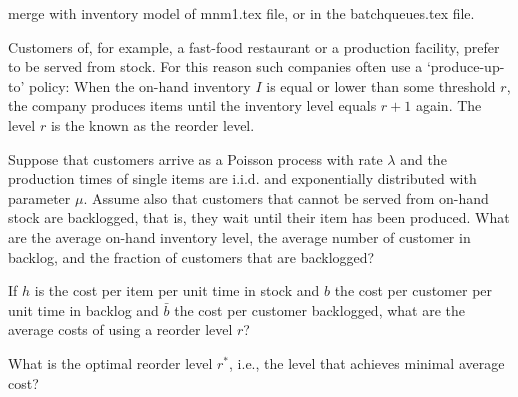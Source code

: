 \begin{question}[use=false]
\label{q:basestock}

merge with inventory model of mnm1.tex file, or in the batchqueues.tex file.

Customers of, for example, a fast-food restaurant or a production
facility, prefer to be served from stock. For this reason such
companies often use a `produce-up-to' policy: When the on-hand
inventory $I$ is equal or lower than some threshold $r$, the company
produces items until the inventory level equals $r+1$ again. The level
$r$ is the known as the reorder level.

Suppose that customers arrive as a Poisson process with rate $\lambda$
and the production times of single items are i.i.d. and exponentially
distributed with parameter $\mu$. Assume also that customers that
cannot be served from on-hand stock are backlogged, that is, they wait
until their item has been produced. What are the average on-hand
inventory level, the average number of customer in backlog, and the
fraction of customers that are backlogged?

If $h$ is the cost per item per unit time in stock and $b$ the cost
per customer per unit time in backlog and $\bar b$ the cost per customer
backlogged, what are the average costs of using a reorder level $r$? 

What is the optimal reorder level $r^*$, i.e., the level that achieves
minimal average cost?


  \begin{solution}
  \end{solution}
\end{question}

